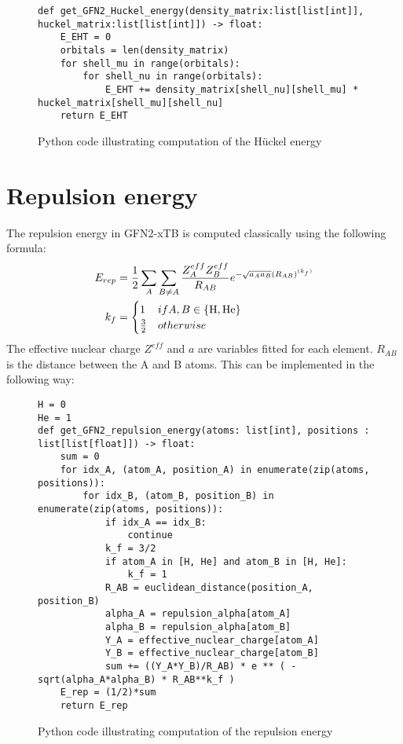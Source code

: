 \begin{figure}[H]
\begin{verbatim}
def get_GFN2_Huckel_energy(density_matrix:list[list[int]], huckel_matrix:list[list[int]]) -> float:
    E_EHT = 0
    orbitals = len(density_matrix)
    for shell_mu in range(orbitals):
        for shell_nu in range(orbitals):
            E_EHT += density_matrix[shell_nu][shell_mu] * huckel_matrix[shell_mu][shell_nu]
    return E_EHT
\end{verbatim}
\caption{Python code illustrating computation of the Hückel energy}
\end{figure}


\section{Repulsion energy}
The repulsion energy in GFN2-xTB is computed classically using the following formula:
\begin{align}
    \E{rep} &= \frac{1}{2}\sum_{A}\sum_{B\neq A}\frac{Z^{eff}_A Z^{eff}_B}{R_{AB}}e^{-\sqrt{a_Aa_B}(R_{AB})^{(k_f)}}\\
k_f &= \begin{cases}1 & if A,B\in\{\text{H},\text{He}\}\\\frac{3}{2}&otherwise\end{cases} 
\end{align}
The effective nuclear charge $Z^{eff}$ and $a$ are variables fitted for each element. 
$R_{AB}$ is the distance between the A and B atoms.
This can be implemented in the following way:

\begin{figure}[H]
\begin{verbatim}
H = 0
He = 1
def get_GFN2_repulsion_energy(atoms: list[int], positions : list[list[float]]) -> float:
    sum = 0
    for idx_A, (atom_A, position_A) in enumerate(zip(atoms, positions)):
        for idx_B, (atom_B, position_B) in enumerate(zip(atoms, positions)):
            if idx_A == idx_B:
                continue
            k_f = 3/2
            if atom_A in [H, He] and atom_B in [H, He]:
                k_f = 1
            R_AB = euclidean_distance(position_A, position_B)
            alpha_A = repulsion_alpha[atom_A]
            alpha_B = repulsion_alpha[atom_B]
            Y_A = effective_nuclear_charge[atom_A]
            Y_B = effective_nuclear_charge[atom_B]
            sum += ((Y_A*Y_B)/R_AB) * e ** ( - sqrt(alpha_A*alpha_B) * R_AB**k_f )
    E_rep = (1/2)*sum
    return E_rep
\end{verbatim}
\caption{Python code illustrating computation of the repulsion energy}
\end{figure}

